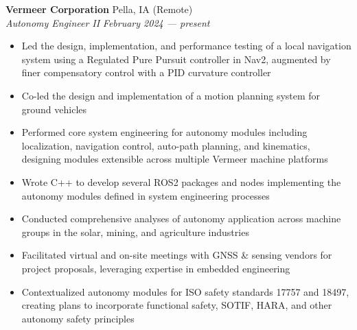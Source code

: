 \documentclass[a4paper]{article}
\begin{document}
\textbf{Vermeer Corporation} \hfill Pella, IA (Remote)\\
\textit{Autonomy Engineer II} \hfill \textit{February 2024 --- present}\\
\vspace{-1mm}
\begin{itemize}
    \item Led the design, implementation, and performance testing of a local navigation system using a Regulated Pure Pursuit controller in Nav2, augmented by finer compensatory control with a PID curvature controller
    \item Co-led the design and implementation of a motion planning system for ground vehicles
    \item Performed core system engineering for autonomy modules including localization, navigation control, auto-path planning, and kinematics, designing modules extensible across multiple Vermeer machine platforms
    \item Wrote C++ to develop several ROS2 packages and nodes implementing the autonomy modules defined in system engineering processes
    \item Conducted comprehensive analyses of autonomy application across machine groups in the solar, mining, and agriculture industries
    \item Facilitated virtual and on-site meetings with GNSS \& sensing vendors for project proposals, leveraging expertise in embedded engineering
    \item Contextualized autonomy modules for ISO safety standards 17757 and 18497, creating plans to incorporate functional safety, SOTIF, HARA, and other autonomy safety principles
\end{itemize}
\end{document}
